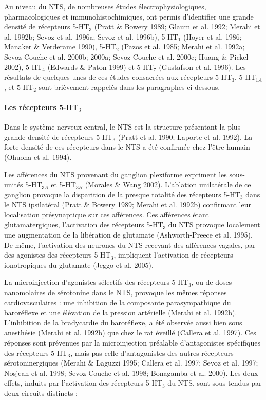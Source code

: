 \documentclass[a4paper,12pt,twoside]{report}
\begin{document}
Au niveau du NTS, de nombreuses études électrophysiologiques, pharmacologiques et immunohistochimiques, ont permis d'identifier une grande densité de récepteurs 5-HT$_{3}$ (Pratt \& Bowery 1989; Glaum et al. 1992; Merahi et al. 1992b; Sevoz et al. 1996a; Sevoz et al. 1996b), 5-HT$_{1}$ (Hoyer et al. 1986; Manaker \& Verderame 1990), 5-HT$_{2}$ (Pazos et al. 1985; Merahi et al. 1992a; Sevoz-Couche et al. 2000b; 2000a; Sevoz-Couche et al. 2000c; Huang \& Pickel 2002), 5-HT$_{4}$ (Edwards \& Paton 1999) et 5-HT$_{7}$ (Gustafson et al. 1996). 
Les résultats de quelques unes de ces études consacrées aux récepteurs 5-HT$_{3}$, 5-HT$_{1A}$, et 5-HT$_{2}$ sont brièvement rappelés dans les paragraphes ci-dessous.

\paragraph{Les récepteurs 5-HT$_{3}$}

Dans le système nerveux central, le NTS est la structure présentant la plus grande densité de récepteurs 5-HT$_{3}$ (Pratt et al. 1990; Laporte et al. 1992). La forte densité de ces récepteurs dans le NTS a été confirmée chez l’être humain (Ohuoha et al. 1994).

Les afférences du NTS provenant du ganglion plexiforme expriment les sous-unités 5-HT$_{3A}$ et 5-HT$_{3B}$ (Morales \& Wang 2002). L’ablation unilatérale de ce ganglion provoque la disparition de la presque totalité des récepteurs 5-HT$_{3}$ dans le NTS ipsilatéral (Pratt \& Bowery 1989; Merahi et al. 1992b) confirmant leur localisation présynaptique sur ces afférences. Ces afférences étant glutamatergiques, l’activation des récepteurs 5-HT$_{3}$ du NTS provoque localement une augmentation de la libération de glutamate (Ashworth-Preece et al. 1995). De même, l’activation des neurones du NTS recevant des afférences vagales, par des agonistes des récepteurs 5-HT$_{3}$, impliquent l’activation de récepteurs ionotropiques du glutamate (Jeggo et al. 2005).

La microinjection d'agonistes sélectifs des récepteurs 5-HT$_{3}$, ou de doses nanomolaires de sérotonine dans le NTS, provoque les mêmes réponses cardiovasculaires : une inhibition de la composante parasympathique du baroréflexe et une élévation de la pression artérielle (Merahi et al. 1992b). L’inhibition de la bradycardie du baroréflexe, a été observée aussi bien sous anesthésie (Merahi et al. 1992b) que chez le rat éveillé (Callera et al. 1997). Ces réponses sont prévenues par la microinjection préalable d’antagonistes spécifiques des récepteurs 5-HT$_{3}$, mais pas celle d’antagonistes des autres récepteurs sérotoninergiques (Merahi \& Laguzzi 1995; Callera et al. 1997; Sevoz et al. 1997; Nosjean et al. 1998; Sevoz-Couche et al. 1998; Bonagamba et al. 2000). Les deux effets, induits par l’activation des récepteurs 5-HT$_{3}$ du NTS, sont sous-tendus par deux circuits distincts : 
\end{document}
